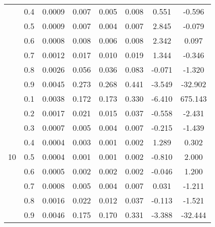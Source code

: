 \documentclass[11pt,a4paper]{report}
\begin{document}
\begin{longtable}{ | c | c || c | c | c | c | c | c | }
 & 0.4 & 0.0009 & 0.007 & 0.005 & 0.008 & 0.551 & -0.596 \\
 & 0.5 & 0.0009 & 0.007 & 0.004 & 0.007 & 2.845 & -0.079 \\
 & 0.6 & 0.0008 & 0.008 & 0.006 & 0.008 & 2.342 & 0.097 \\
 & 0.7 & 0.0012 & 0.017 & 0.010 & 0.019 & 1.344 & -0.346 \\
 & 0.8 & 0.0026 & 0.056 & 0.036 & 0.083 & -0.071 & -1.320 \\
 & 0.9 & 0.0045 & 0.273 & 0.268 & 0.441 & -3.549 & -32.902 \\
 \hline
\multirow{9}{*}{10} & 0.1 & 0.0038 & 0.172 & 0.173 & 0.330 & -6.410 & 675.143 \\
 & 0.2 & 0.0017 & 0.021 & 0.015 & 0.037 & -0.558 & -2.431 \\
 & 0.3 & 0.0007 & 0.005 & 0.004 & 0.007 & -0.215 & -1.439 \\
 & 0.4 & 0.0004 & 0.003 & 0.001 & 0.002 & 1.289 & 0.302 \\
 & 0.5 & 0.0004 & 0.001 & 0.001 & 0.002 & -0.810 & 2.000 \\
 & 0.6 & 0.0005 & 0.002 & 0.002 & 0.002 & -0.046 & 1.200 \\
 & 0.7 & 0.0008 & 0.005 & 0.004 & 0.007 & 0.031 & -1.211 \\
 & 0.8 & 0.0016 & 0.022 & 0.012 & 0.037 & -0.113 & -1.521 \\
 & 0.9 & 0.0046 & 0.175 & 0.170 & 0.331 & -3.388 & -32.444 \\
 \hline
\hline
\end{longtable}
\end{document}
